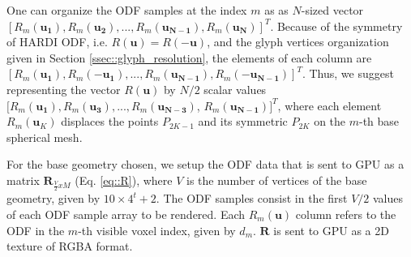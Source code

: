 \documentclass[twoside,twocolumn,10pt]{article}
\begin{document}



One can organize the ODF samples at the index $m$ as as $N$-sized vector $[R_m(\bm{u_1}), R_m(\bm{u_2}), ..., R_m(\bm{u_{N-1}}), R_m(\bm{u_{N}})]^T$. Because of the symmetry of HARDI ODF, i.e. $R(\bm{u}) = R(-\bm{u})$, and the glyph vertices organization given in Section \ref{ssec::glyph_resolution}, the elements of each column are $[R_m(\bm{u_1}), R_m(-\bm{u_1}), ..., R_m(\bm{u_{N-1}}), R_m(-\bm{u_{N-1}})]^T$. Thus, we suggest  representing the vector $R(\bm{u})$ by $N/2$ scalar values $[R_m(\bm{u_1}), R_m(\bm{u_3}), ..., R_m(\bm{u_{N-3}})$, $R_m(\bm{u_{N-1}})]^T$, where each element $R_m(\bm{u}_{K})$ displaces the points $P_{2K-1}$ and its symmetric $P_{2K}$ on the $m$-th base spherical mesh.


For the base geometry chosen, we setup the ODF data that is sent to GPU as a matrix $\bm{R}_{\frac{V}{2}xM}$ (Eq. \ref{eq::R}), where $V$ is the number of vertices of the base geometry, given by $10 \times 4^t + 2$. The ODF samples consist in the first $V/2$ values of each ODF sample array to be rendered. Each $R_m(\bm{u})$ column refers to the ODF in the $m$-th visible voxel index, given by $d_m$. $\bm{R}$ is sent to GPU as a 2D texture of RGBA format.

\end{document}
